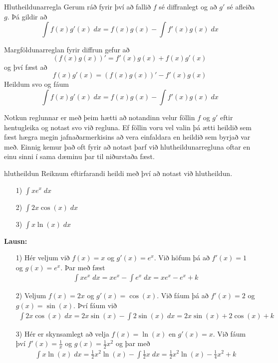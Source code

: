 \begin{regla}{Hlutheildunarregla}
Gerum ráð fyrir því að fallið $f$ sé diffranlegt og að $g'$ sé afleiða $g$. Þá gildir að
$$
\int f(x)g'(x)\;dx = f(x)g(x) - \int f'(x)g(x)\;dx
$$
\end{regla}

\begin{sonnun}
Margföldunarreglan fyrir diffrun gefur að
$$
\left(f(x)g(x)\right)' = f'(x)g(x) + f(x)g'(x)
$$
og því fæst að
$$
f(x)g'(x) = \left(f(x)g(x)\right)' - f'(x)g(x)
$$
Heildum svo og fáum
$$
\int f(x)g'(x)\;dx = f(x)g(x) - \int f'(x)g(x)\;dx
$$
\end{sonnun}

\begin{ath}
Notkun reglunnar er með þeim hætti að notandinn velur föllin $f$ og $g'$ eftir hentugleika og notast svo við regluna. Ef föllin voru vel valin þá ætti heildið sem fæst hægra megin jafnaðarmerkisins að vera einfaldara en heildið sem byrjað var með. Einnig kemur það oft fyrir að notast þarf við hlutheildunarregluna oftar en einu sinni í sama dæminu þar til niðurstaða fæst.
\end{ath}

\begin{syn}{hlutheildun}
Reiknum eftirfarandi heildi með því að notast við hlutheildun.
\begin{itemize}
\item[1)] $\displaystyle \int xe^{x} \; dx$

\item[2)] $\displaystyle \int 2x\cos(x) \; dx$

\item[3)] $\displaystyle \int x\ln(x) \; dx$
\end{itemize}

\vspace{2mm}

{\bf Lausn:}

\begin{itemize}
\item[1)] Hér veljum við $f(x) = x$ og $g'(x) = e^{x}$. Við höfum þá að $f'(x) = 1$ og $g(x) = e^{x}$. Þar með fæst
\begin{align*}
\int xe^{x} \; dx = xe^{x} - \int e^{x} \; dx = xe^{x} - e^{x} + k
\end{align*}

\item[2)] Veljum $f(x) = 2x$ og $g'(x) = \cos(x)$. Við fáum þá að $f'(x) = 2$ og $g(x) = \sin(x)$. Því fáum við
\begin{align*}
\int 2x\cos(x) \; dx = 2x\sin(x) - \int 2\sin(x) \; dx = 2x\sin(x) + 2\cos(x) + k
\end{align*}

\item[3)] Hér er skynsamlegt að velja $f(x) = \ln(x)$ en $g'(x) = x$. Við fáum því $f'(x) = \frac{1}{x}$ og $g(x) = \frac{1}{2}x^{2}$ og þar með
\begin{align*}
\int x\ln(x) \; dx = \frac{1}{2}x^{2}\ln(x) - \int \frac{1}{2}x \; dx = \frac{1}{2}x^{2}\ln(x) - \frac{1}{4}x^{2} + k
\end{align*}
\end{itemize}

\end{syn}

